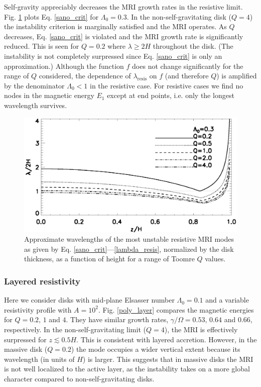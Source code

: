 Self-gravity appreciably decreases the MRI growth rates in the
resistive limit. Fig. \ref{lambda_poly_resis} plots 
Eq. \ref{sano_crit} for $\Lambda_0=0.3$. In the non-self-gravitating
disk ($Q=4$) the instability criterion is marginally satisfied and the
MRI operates. As $Q$ decreases, 
Eq. \ref{sano_crit} is violated and the MRI growth rate is
significantly reduced. This is seen for $Q=0.2$ where $\lambda \geq 2H$ throughout
the disk. (The instability is not completely surpressed since
Eq. \ref{sano_crit} is only an approximation.) Although the function
$f$ does not change significantly for the range of $Q$ considered, the
dependence of $\lambda_\mathrm{resis}$ on $f$ (and therefore $Q$) is
amplified by the denominator $\Lambda_0<1$ in the resistive case. For
resistive cases we find no nodes in the magnetic energy $E_1$ except
at end points, i.e. only the longest wavelength survives.   

\begin{figure}
  \includegraphics[width=\linewidth]{figures/lambda_poly_uniresis}
  \caption{Approximate wavelengths of the most unstable resistive MRI modes as given by
    Eq. \ref{sano_crit}---\ref{lambda_resis}, normalized by the 
    disk thickness, as a function of height for a range of Toomre $Q$
    values.  
    \label{lambda_poly_resis}}
\end{figure}

\subsubsection{Layered
  resistivity} 
Here we consider disks with mid-plane Elsasser number $\Lambda_0=0.1$
and a variable resistivity profile with
$A=10^2$. Fig. \ref{poly_layer} compares the magnetic  
energies for $Q=0.2,\,1$ and $4$. They have similar growth rates, $\gamma/\Omega
= 0.53,\,0.64$ and $0.66$, respectively. In the non-self-gravitating
limit ($Q=4$), the MRI is effectively surpressed for
$z\lesssim0.5H$. This is consistent with layered accretion. However,
in the massive disk ($Q=0.2$) the mode occupies a wider vertical
extent because its wavelength (in units of $H$) is larger. This
suggests that in massive disks the MRI is not well localized to the
active layer, as the instability takes on a more global character
compared to non-self-gravitating disks.        

